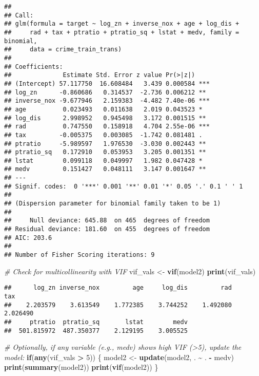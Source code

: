 \documentclass[
]{article}
\newenvironment{Shaded}{\begin{snugshade}}{\end{snugshade}}
\newcommand{\CommentTok}[1]{\textcolor[rgb]{0.56,0.35,0.01}{\textit{#1}}}
\newcommand{\ControlFlowTok}[1]{\textcolor[rgb]{0.13,0.29,0.53}{\textbf{#1}}}
\newcommand{\DecValTok}[1]{\textcolor[rgb]{0.00,0.00,0.81}{#1}}
\newcommand{\FunctionTok}[1]{\textcolor[rgb]{0.13,0.29,0.53}{\textbf{#1}}}
\newcommand{\NormalTok}[1]{#1}
\newcommand{\OtherTok}[1]{\textcolor[rgb]{0.56,0.35,0.01}{#1}}
\newcommand{\SpecialCharTok}[1]{\textcolor[rgb]{0.81,0.36,0.00}{\textbf{#1}}}
\begin{document}
\begin{verbatim}
## 
## Call:
## glm(formula = target ~ log_zn + inverse_nox + age + log_dis + 
##     rad + tax + ptratio + ptratio_sq + lstat + medv, family = binomial, 
##     data = crime_train_trans)
## 
## Coefficients:
##              Estimate Std. Error z value Pr(>|z|)    
## (Intercept) 57.117750  16.608484   3.439 0.000584 ***
## log_zn      -0.860686   0.314537  -2.736 0.006212 ** 
## inverse_nox -9.677946   2.159383  -4.482 7.40e-06 ***
## age          0.023493   0.011638   2.019 0.043523 *  
## log_dis      2.998952   0.945498   3.172 0.001515 ** 
## rad          0.747550   0.158918   4.704 2.55e-06 ***
## tax         -0.005375   0.003085  -1.742 0.081481 .  
## ptratio     -5.989597   1.976530  -3.030 0.002443 ** 
## ptratio_sq   0.172910   0.053953   3.205 0.001351 ** 
## lstat        0.099118   0.049997   1.982 0.047428 *  
## medv         0.151427   0.048111   3.147 0.001647 ** 
## ---
## Signif. codes:  0 '***' 0.001 '**' 0.01 '*' 0.05 '.' 0.1 ' ' 1
## 
## (Dispersion parameter for binomial family taken to be 1)
## 
##     Null deviance: 645.88  on 465  degrees of freedom
## Residual deviance: 181.60  on 455  degrees of freedom
## AIC: 203.6
## 
## Number of Fisher Scoring iterations: 9
\end{verbatim}

\begin{Shaded}
\begin{Highlighting}[]
\CommentTok{\# Check for multicollinearity with VIF}
\NormalTok{vif\_vals }\OtherTok{\textless{}{-}} \FunctionTok{vif}\NormalTok{(model2)}
\FunctionTok{print}\NormalTok{(vif\_vals)}
\end{Highlighting}
\end{Shaded}

\begin{verbatim}
##      log_zn inverse_nox         age     log_dis         rad         tax 
##    2.203579    3.613549    1.772385    3.744252    1.492080    2.026490 
##     ptratio  ptratio_sq       lstat        medv 
##  501.815972  487.350377    2.129195    3.005525
\end{verbatim}

\begin{Shaded}
\begin{Highlighting}[]
\CommentTok{\# Optionally, if any variable (e.g., medv) shows high VIF (\textgreater{}5), update the model:}
\ControlFlowTok{if}\NormalTok{(}\FunctionTok{any}\NormalTok{(vif\_vals }\SpecialCharTok{\textgreater{}} \DecValTok{5}\NormalTok{)) \{}
\NormalTok{  model2 }\OtherTok{\textless{}{-}} \FunctionTok{update}\NormalTok{(model2, . }\SpecialCharTok{\textasciitilde{}}\NormalTok{ . }\SpecialCharTok{{-}}\NormalTok{ medv)}
  \FunctionTok{print}\NormalTok{(}\FunctionTok{summary}\NormalTok{(model2))}
  \FunctionTok{print}\NormalTok{(}\FunctionTok{vif}\NormalTok{(model2))}
\NormalTok{\}}
\end{Highlighting}
\end{Shaded}
\end{document}
